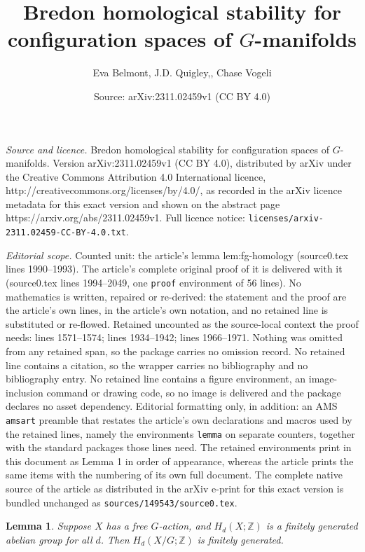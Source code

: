 \documentclass[10pt,a4paper]{amsart}
\title{Bredon homological stability for configuration spaces of $G$-manifolds}
\author{Eva Belmont, J.D. Quigley,, Chase Vogeli}
\date{Source: arXiv:2311.02459v1 (CC BY 4.0)}
\newtheorem{lemma}{Lemma}
\newcommand{\Z}{\mathbb{Z}}
\begin{document}
\maketitle

\noindent\emph{Source and licence.} Bredon homological stability for configuration spaces of $G$-manifolds. Version arXiv:2311.02459v1 (CC BY 4.0), distributed by arXiv under the Creative Commons Attribution 4.0 International licence, http://creativecommons.org/licenses/by/4.0/, as recorded in the arXiv licence metadata for this exact version and shown on the abstract page https://arxiv.org/abs/2311.02459v1. Full licence notice: \texttt{licenses/arxiv-2311.02459-CC-BY-4.0.txt}.\par\smallskip

\noindent\textit{Editorial scope.} Counted unit: the article's lemma lem:fg-homology (source0.tex lines 1990--1993). The article's complete original proof of it is delivered with it (source0.tex lines 1994--2049, one \texttt{proof} environment of 56 lines). No mathematics is written, repaired or re-derived: the statement and the proof are the article's own lines, in the article's own notation, and no retained line is substituted or re-flowed.  Retained uncounted as the source-local context the proof needs: lines 1571--1574; lines 1934--1942; lines 1966--1971.  Nothing was omitted from any retained span, so the package carries no omission record.  No retained line contains a citation, so the wrapper carries no bibliography and no bibliography entry.  No retained line contains a figure environment, an image-inclusion command or drawing code, so no image is delivered and the package declares no asset dependency.  Editorial formatting only, in addition: an AMS \texttt{amsart} preamble that restates the article's own declarations and macros used by the retained lines, namely the environments \texttt{lemma} on separate counters, together with the standard packages those lines need.  The retained environments print in this document as Lemma 1 in order of appearance, whereas the article prints the same items with the numbering of its own full document.  The complete native source of the article as distributed in the arXiv e-print for this exact version is bundled unchanged as \texttt{sources/149543/source0.tex}.
\begin{lemma} \label{lem:homology-orbits-finite}
Suppose $X$ has a free $G$-action, and $H_d(X;\Z)$ is a finitely generated
abelian group for all $d$. Then $H_d(X/G;\Z)$ is finitely generated.
\end{lemma}
\end{document}
